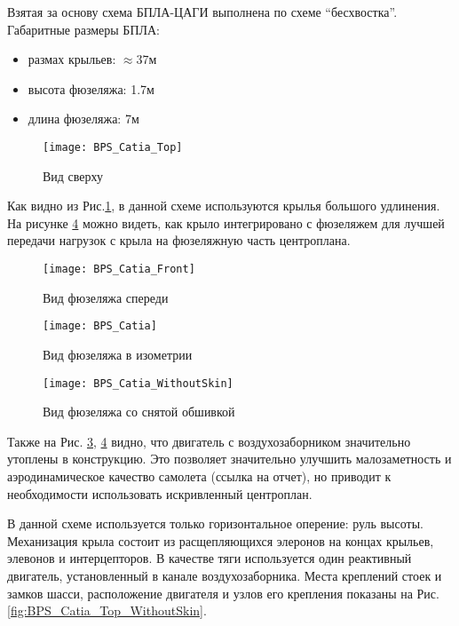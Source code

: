 Взятая за основу схема БПЛА-ЦАГИ выполнена по схеме ``бесхвостка''. Габаритные размеры БПЛА: 
\begin{itemize}
\item размах крыльев: $\approx37\text{м}$
\item высота фюзеляжа: 1.7м
\item длина фюзеляжа: 7м
\end{itemize}


\begin{figure}[H]
\centering
\texttt{[image: BPS\_Catia\_Top]}
\caption{Вид сверху}
\label{fig:BPS_Catia_Top}
\end{figure}

Как видно из Рис.\ref{fig:BPS_Catia_Top}, в данной схеме используются крылья большого удлинения. На рисунке \ref{fig:BPS_Catia_WithoutSkin} можно видеть, как крыло интегрировано с фюзеляжем для лучшей передачи нагрузок с крыла на фюзеляжную часть центроплана.


\begin{figure}[H]
\centering
\texttt{[image: BPS\_Catia\_Front]}
\caption{Вид фюзеляжа спереди}
\label{fig:BPS_Catia_Front}
\end{figure}




\begin{figure}[H]
\centering
\texttt{[image: BPS\_Catia]}
\caption{Вид фюзеляжа в изометрии}
\label{fig:BPS_Catia}
\end{figure}

\begin{figure}[H]
\centering
\texttt{[image: BPS\_Catia\_WithoutSkin]}
\caption{Вид фюзеляжа со снятой обшивкой}
\label{fig:BPS_Catia_WithoutSkin}
\end{figure}

Также на Рис. \ref{fig:BPS_Catia}, \ref{fig:BPS_Catia_WithoutSkin} видно, что двигатель с воздухозаборником значительно утоплены в конструкцию. Это позволяет значительно улучшить малозаметность и аэродинамическое качество самолета (ссылка на отчет), но приводит к необходимости использовать искривленный центроплан. 

В данной схеме используется только горизонтальное оперение: руль высоты. Механизация крыла состоит из расщепляющихся элеронов на концах крыльев, элевонов и интерцепторов. В качестве тяги используется один реактивный двигатель, установленный в канале воздухозаборника. Места креплений стоек и замков шасси, расположение двигателя и узлов его крепления показаны на Рис. \ref{fig:BPS_Catia_Top_WithoutSkin}. 


